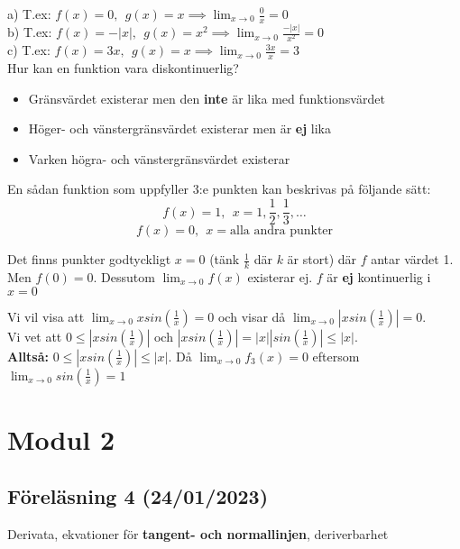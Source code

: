 \documentclass{report}
\begin{document}
\sol a) T.ex: $ f(x) = 0,\:\:g(x) = x \implies \lim_{x \to 0} \frac{0}{x} = 0  $\\ 
\sol b) T.ex: $ f(x) = -|x|,\:\:g(x) = x^2 \implies \lim_{x \to 0} \frac{-|x|}{x^2} = 0 $\\
\sol c) T.ex: $ f(x) = 3x,\:\:g(x) = x \implies \lim_{x \to 0} \frac{3x}{x} = 3  $\\


\pagebreak
\noindent
Hur kan en funktion vara diskontinuerlig?\\
\begin{itemize}
	\item Gränsvärdet existerar men den \textbf{inte} är lika med funktionsvärdet
	\item Höger- och vänstergränsvärdet existerar men är \textbf{ej} lika
	\item Varken högra- och vänstergränsvärdet existerar
\end{itemize}

\ex{}
{
En sådan funktion som uppfyller 3:e punkten kan beskrivas på följande sätt:
\begin{equation*}
f(x) = 1,\:\:x = 1, \frac{1}{2} , \frac{1}{3} , \ldots
\end{equation*}
\begin{equation*}
f(x) = 0,\:\:x = \text{alla andra punkter} 
\end{equation*}

Det finns punkter godtyckligt $ x=0 $ (tänk $ \frac{1}{k} $ där $ k $ är stort) där $ f $ antar värdet 1. Men $ f(0) = 0 $. Dessutom $ \lim_{x \to 0} f(x) $ existerar ej. $ f $ är \textbf{ej} kontinuerlig i $ x=0 $  
}

{
Vi vil visa att $ \lim_{x \to 0} x sin( \frac{1}{x} ) = 0 $ och visar då $ \lim_{x \to 0} |xsin( \frac{1}{x} )| = 0 $.\\
Vi vet att $ 0 \le |xsin( \frac{1}{x} )| $ och $ |xsin( \frac{1}{x} )| = |x||sin( \frac{1}{x} )| \le |x| $.\\
\textbf{Alltså:} $ 0 \le |xsin( \frac{1}{x} )| \le |x| $. Då $ \lim_{x \to 0} f_3(x) = 0 $ eftersom $ \lim_{x \to 0} sin( \frac{1}{x} ) = 1 $  
}

\pagebreak
\chapter{Modul 2}
\section{Föreläsning 4 (24/01/2023)}
Derivata, ekvationer för \textbf{tangent- och normallinjen}, deriverbarhet \\\\
\end{document}
